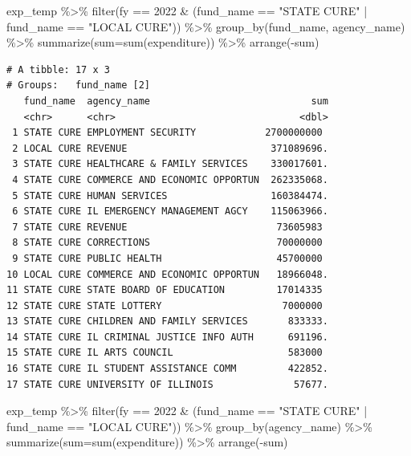 \documentclass[
  letterpaper,
  DIV=11,
  numbers=noendperiod]{scrreport}
\newenvironment{Shaded}{\begin{snugshade}}{\end{snugshade}}
\newcommand{\AttributeTok}[1]{\textcolor[rgb]{0.40,0.45,0.13}{#1}}
\newcommand{\DecValTok}[1]{\textcolor[rgb]{0.68,0.00,0.00}{#1}}
\newcommand{\FunctionTok}[1]{\textcolor[rgb]{0.28,0.35,0.67}{#1}}
\newcommand{\NormalTok}[1]{\textcolor[rgb]{0.00,0.23,0.31}{#1}}
\newcommand{\SpecialCharTok}[1]{\textcolor[rgb]{0.37,0.37,0.37}{#1}}
\newcommand{\StringTok}[1]{\textcolor[rgb]{0.13,0.47,0.30}{#1}}
\begin{document}
\begin{Shaded}
\begin{Highlighting}[]
\NormalTok{exp\_temp }\SpecialCharTok{\%\textgreater{}\%} \FunctionTok{filter}\NormalTok{(fy }\SpecialCharTok{==} \DecValTok{2022} \SpecialCharTok{\&}\NormalTok{ (fund\_name }\SpecialCharTok{==} \StringTok{"STATE CURE"} \SpecialCharTok{|}\NormalTok{ fund\_name }\SpecialCharTok{==} \StringTok{"LOCAL CURE"}\NormalTok{)) }\SpecialCharTok{\%\textgreater{}\%} \FunctionTok{group\_by}\NormalTok{(fund\_name, agency\_name) }\SpecialCharTok{\%\textgreater{}\%} \FunctionTok{summarize}\NormalTok{(}\AttributeTok{sum=}\FunctionTok{sum}\NormalTok{(expenditure)) }\SpecialCharTok{\%\textgreater{}\%} \FunctionTok{arrange}\NormalTok{(}\SpecialCharTok{{-}}\NormalTok{sum)}
\end{Highlighting}
\end{Shaded}

\begin{verbatim}
# A tibble: 17 x 3
# Groups:   fund_name [2]
   fund_name  agency_name                            sum
   <chr>      <chr>                                <dbl>
 1 STATE CURE EMPLOYMENT SECURITY            2700000000 
 2 LOCAL CURE REVENUE                         371089696.
 3 STATE CURE HEALTHCARE & FAMILY SERVICES    330017601.
 4 STATE CURE COMMERCE AND ECONOMIC OPPORTUN  262335068.
 5 STATE CURE HUMAN SERVICES                  160384474.
 6 STATE CURE IL EMERGENCY MANAGEMENT AGCY    115063966.
 7 STATE CURE REVENUE                          73605983 
 8 STATE CURE CORRECTIONS                      70000000 
 9 STATE CURE PUBLIC HEALTH                    45700000 
10 LOCAL CURE COMMERCE AND ECONOMIC OPPORTUN   18966048.
11 STATE CURE STATE BOARD OF EDUCATION         17014335 
12 STATE CURE STATE LOTTERY                     7000000 
13 STATE CURE CHILDREN AND FAMILY SERVICES       833333.
14 STATE CURE IL CRIMINAL JUSTICE INFO AUTH      691196.
15 STATE CURE IL ARTS COUNCIL                    583000 
16 STATE CURE IL STUDENT ASSISTANCE COMM         422852.
17 STATE CURE UNIVERSITY OF ILLINOIS              57677.
\end{verbatim}

\begin{Shaded}
\begin{Highlighting}[]
\NormalTok{exp\_temp }\SpecialCharTok{\%\textgreater{}\%} \FunctionTok{filter}\NormalTok{(fy }\SpecialCharTok{==} \DecValTok{2022} \SpecialCharTok{\&}\NormalTok{ (fund\_name }\SpecialCharTok{==} \StringTok{"STATE CURE"} \SpecialCharTok{|}\NormalTok{ fund\_name }\SpecialCharTok{==} \StringTok{"LOCAL CURE"}\NormalTok{)) }\SpecialCharTok{\%\textgreater{}\%} \FunctionTok{group\_by}\NormalTok{(agency\_name) }\SpecialCharTok{\%\textgreater{}\%} \FunctionTok{summarize}\NormalTok{(}\AttributeTok{sum=}\FunctionTok{sum}\NormalTok{(expenditure)) }\SpecialCharTok{\%\textgreater{}\%} \FunctionTok{arrange}\NormalTok{(}\SpecialCharTok{{-}}\NormalTok{sum)}
\end{Highlighting}
\end{Shaded}
\end{document}
